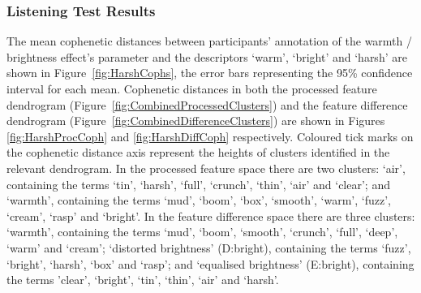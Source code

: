 		\subsubsection{Listening Test Results}
			The mean cophenetic distances between participants' annotation of the warmth / brightness effect's
			parameter and the descriptors `warm', `bright' and `harsh' are shown in
			Figure~\ref{fig:HarshCophs}, the error bars representing the 95\% confidence interval for each
			mean.  Cophenetic distances in both the processed feature dendrogram
			(Figure~\ref{fig:CombinedProcessedClusters}) and the feature difference dendrogram
			(Figure~\ref{fig:CombinedDifferenceClusters}) are shown in Figures \ref{fig:HarshProcCoph} and
			\ref{fig:HarshDiffCoph} respectively. Coloured tick marks on the cophenetic distance axis represent
			the heights of clusters identified in the relevant dendrogram. In the processed feature space there
			are two clusters: `air', containing the terms `tin', `harsh', `full', `crunch', `thin', `air' and
			`clear'; and `warmth', containing the terms `mud', `boom', `box', `smooth', `warm', `fuzz',
			`cream', `rasp' and `bright'. In the feature difference space there are three clusters: `warmth',
			containing the terms `mud', `boom', `smooth', `crunch', `full', `deep', `warm' and `cream';
			`distorted brightness' (D:bright), containing the terms `fuzz', `bright', `harsh', `box' and
			`rasp'; and `equalised brightness' (E:bright), containing the terms 'clear', `bright', `tin',
			`thin', `air' and `harsh'.

